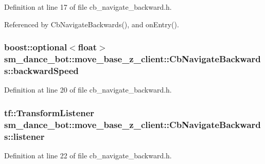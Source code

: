 Definition at line 17 of file cb\+\_\+navigate\+\_\+backward.\+h.



Referenced by Cb\+Navigate\+Backwards(), and on\+Entry().

\subsubsection[{\texorpdfstring{backward\+Speed}{backwardSpeed}}]{\setlength{\rightskip}{0pt plus 5cm}boost\+::optional$<$float$>$ sm\+\_\+dance\+\_\+bot\+::move\+\_\+base\+\_\+z\+\_\+client\+::\+Cb\+Navigate\+Backwards\+::backward\+Speed}\hypertarget{classsm__dance__bot_1_1move__base__z__client_1_1CbNavigateBackwards_a175ffec2b79c411ee1b88cff62ed37e9}{}\label{classsm__dance__bot_1_1move__base__z__client_1_1CbNavigateBackwards_a175ffec2b79c411ee1b88cff62ed37e9}


Definition at line 20 of file cb\+\_\+navigate\+\_\+backward.\+h.

\subsubsection[{\texorpdfstring{listener}{listener}}]{\setlength{\rightskip}{0pt plus 5cm}tf\+::\+Transform\+Listener sm\+\_\+dance\+\_\+bot\+::move\+\_\+base\+\_\+z\+\_\+client\+::\+Cb\+Navigate\+Backwards\+::listener}\hypertarget{classsm__dance__bot_1_1move__base__z__client_1_1CbNavigateBackwards_aeaaa632b142737c65bc87587aa02a3bf}{}\label{classsm__dance__bot_1_1move__base__z__client_1_1CbNavigateBackwards_aeaaa632b142737c65bc87587aa02a3bf}


Definition at line 22 of file cb\+\_\+navigate\+\_\+backward.\+h.

